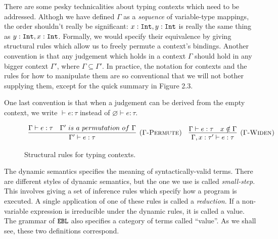 There are some pesky technicalities about typing contexts which need to be addressed. Althogh we have defined $\Gamma$ as a \textit{sequence} of variable-type mappings, the order shouldn't really be significant: $x: \mathtt{Int}, y: \mathtt{Int}$ is really the same thing as $y: \mathtt{Int}, x: \mathtt{Int}$. Formally, we would specify their equivalence by giving structural rules which allow us to freely permute a context's bindings. Another convention is that any judgement which holds in a context $\Gamma$ should hold in any bigger context $\Gamma'$, where $\Gamma \subseteq \Gamma'$. In practice, the notation for contexts and the rules for how to manipulate them are so conventional that we will not bother supplying them, except for the quick summary in Figure 2.3.

One last convention is that when a judgement can be derived from the empty context, we write $\vdash e: \tau$ instead of $\varnothing \vdash e: \tau$.\\


\begin{figure}[h]

\noindent
{}

\[
\begin{array}{c}

\infer[\textsc{($\Gamma$-Permute)}]
	{\Gamma' \vdash e: \tau}
	{\Gamma \vdash e: \tau & \Gamma'~is~a~permutation~of~\Gamma}
	~~~
\infer[\textsc{($\Gamma$-Widen)}]
	{\Gamma, x: \tau' \vdash e: \tau }
	{\Gamma \vdash e: \tau & x \notin \Gamma}

	
\end{array}
\]

\vspace{-12pt}
\caption{Structural rules for typing contexts.}
\label{A sample. }
\end{figure}

The dynamic semantics specifies the meaning of syntactically-valid terms. There are different styles of dynamic semantics, but the one we use is called \textit{small-step}. This involves giving a set of inference rules which specify how a program is executed. A single application of one of these rules is called a \textit{reduction}. If a non-variable expression is irreducible under the dynamic rules, it is called a value. The grammar of $\mathtt{EBL}$ also specifies a category of terms called ``value''. As we shall see, these two definitions correspond.

